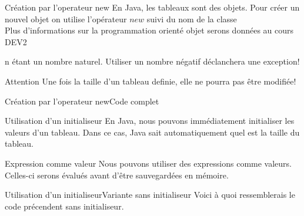 \begin{frame}{Création par l'operateur new}
    En Java, les tableaux sont des objets. Pour créer un nouvel objet on utilise l'opérateur $new$ suivi du nom de la classe\\
    \tiny Plus d'informations sur la programmation orienté objet serons données au cours DEV2 \normalsize

    
    n étant un nombre naturel. Utiliser un nombre négatif déclanchera une exception!

    \begin{alertblock}{Attention}
        Une fois la taille d'un tableau definie, elle ne pourra pas être modifiée!
    \end{alertblock}
\end{frame}

\begin{frame}{Création par l'operateur new}{Code complet}
    
\end{frame}

\begin{frame}{Utilisation d'un initialiseur}
    En Java, nous pouvons immédiatement initialiser les valeurs d'un tableau.
    Dans ce cas, Java sait automatiquement quel est la taille du tableau.
    

    \begin{exampleblock}{Expression comme valeur}
        Nous pouvons utiliser des expressions comme valeurs.
        Celles-ci serons évalués avant d'être sauvegardées en mémoire.
    \end{exampleblock}

\end{frame}

\begin{frame}{Utilisation d'un initialiseur}{Variante sans initialiseur}
    Voici à quoi ressemblerais le code précendent sans initialiseur.
    
\end{frame}